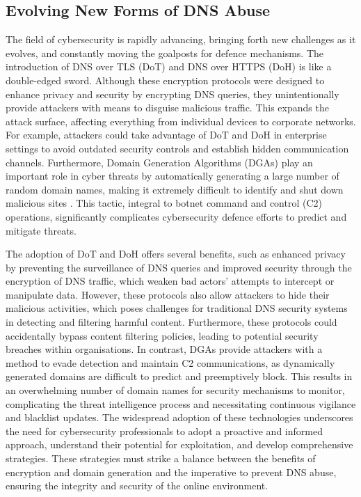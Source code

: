 \subsection{Evolving New Forms of DNS Abuse}

The field of cybersecurity is rapidly advancing, bringing forth new challenges as it evolves, and constantly moving the goalposts for defence mechanisms. The introduction of DNS over TLS (DoT) and DNS over HTTPS (DoH) is like a double-edged sword. Although these encryption protocols were designed to enhance privacy and security by encrypting DNS queries, they unintentionally provide attackers with means to disguise malicious traffic. This expands the attack surface, affecting everything from individual devices to corporate networks. For example, attackers could take advantage of DoT and DoH in enterprise settings to avoid outdated security controls and establish hidden communication channels. Furthermore, Domain Generation Algorithms (DGAs) play an important role in cyber threats by automatically generating a large number of random domain names, making it extremely difficult to identify and shut down malicious sites \cite{kaur2023artificial}. This tactic, integral to botnet command and control (C2) operations, significantly complicates cybersecurity defence efforts to predict and mitigate threats.

The adoption of DoT and DoH offers several benefits, such as enhanced privacy by preventing the surveillance of DNS queries and improved security through the encryption of DNS traffic, which weaken bad actors' attempts to intercept or manipulate data. However, these protocols also allow attackers to hide their malicious activities, which poses challenges for traditional DNS security systems in detecting and filtering harmful content. Furthermore, these protocols could accidentally bypass content filtering policies, leading to potential security breaches within organisations.
In contrast, DGAs provide attackers with a method to evade detection and maintain C2 communications, as dynamically generated domains are difficult to predict and preemptively block. This results in an overwhelming number of domain names for security mechanisms to monitor, complicating the threat intelligence process and necessitating continuous vigilance and blacklist updates. The widespread adoption of these technologies underscores the need for cybersecurity professionals to adopt a proactive and informed approach, understand their potential for exploitation, and develop comprehensive strategies. These strategies must strike a balance between the benefits of encryption and domain generation and the imperative to prevent DNS abuse, ensuring the integrity and security of the online environment.


